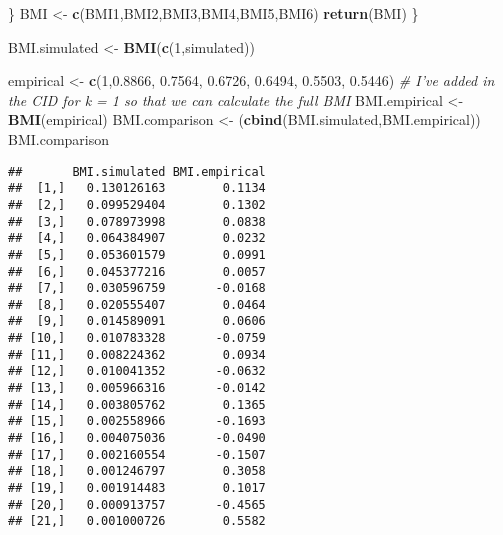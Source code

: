 \documentclass[]{article}
\newenvironment{Shaded}{\begin{snugshade}}{\end{snugshade}}
\newcommand{\KeywordTok}[1]{\textcolor[rgb]{0.13,0.29,0.53}{\textbf{#1}}}
\newcommand{\DecValTok}[1]{\textcolor[rgb]{0.00,0.00,0.81}{#1}}
\newcommand{\FloatTok}[1]{\textcolor[rgb]{0.00,0.00,0.81}{#1}}
\newcommand{\StringTok}[1]{\textcolor[rgb]{0.31,0.60,0.02}{#1}}
\newcommand{\CommentTok}[1]{\textcolor[rgb]{0.56,0.35,0.01}{\textit{#1}}}
\newcommand{\NormalTok}[1]{#1}
\begin{document}
\begin{Shaded}
\begin{Highlighting}[]
\NormalTok{\}}
\NormalTok{BMI <-}\StringTok{ }\KeywordTok{c}\NormalTok{(BMI1,BMI2,BMI3,BMI4,BMI5,BMI6)}
\KeywordTok{return}\NormalTok{(BMI)}
\NormalTok{\}}


\NormalTok{BMI.simulated <-}\StringTok{ }\KeywordTok{BMI}\NormalTok{(}\KeywordTok{c}\NormalTok{(}\DecValTok{1}\NormalTok{,simulated))}

\NormalTok{empirical <-}\StringTok{ }\KeywordTok{c}\NormalTok{(}\DecValTok{1}\NormalTok{,}\FloatTok{0.8866}\NormalTok{,    }\FloatTok{0.7564}\NormalTok{, }\FloatTok{0.6726}\NormalTok{, }\FloatTok{0.6494}\NormalTok{, }\FloatTok{0.5503}\NormalTok{, }\FloatTok{0.5446}\NormalTok{)}
\CommentTok{# I've added in the CID for k = 1 so that we can calculate the full BMI}
\NormalTok{BMI.empirical <-}\StringTok{ }\KeywordTok{BMI}\NormalTok{(empirical)}
\NormalTok{BMI.comparison <-}\StringTok{ }\NormalTok{(}\KeywordTok{cbind}\NormalTok{(BMI.simulated,BMI.empirical))}
\NormalTok{BMI.comparison}
\end{Highlighting}
\end{Shaded}

\begin{verbatim}
##       BMI.simulated BMI.empirical
##  [1,]   0.130126163        0.1134
##  [2,]   0.099529404        0.1302
##  [3,]   0.078973998        0.0838
##  [4,]   0.064384907        0.0232
##  [5,]   0.053601579        0.0991
##  [6,]   0.045377216        0.0057
##  [7,]   0.030596759       -0.0168
##  [8,]   0.020555407        0.0464
##  [9,]   0.014589091        0.0606
## [10,]   0.010783328       -0.0759
## [11,]   0.008224362        0.0934
## [12,]   0.010041352       -0.0632
## [13,]   0.005966316       -0.0142
## [14,]   0.003805762        0.1365
## [15,]   0.002558966       -0.1693
## [16,]   0.004075036       -0.0490
## [17,]   0.002160554       -0.1507
## [18,]   0.001246797        0.3058
## [19,]   0.001914483        0.1017
## [20,]   0.000913757       -0.4565
## [21,]   0.001000726        0.5582
\end{verbatim}
\end{document}
